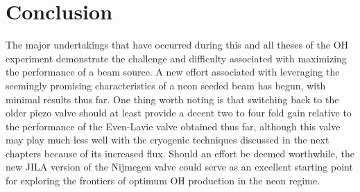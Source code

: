 \section{Conclusion}

The major undertakings that have occurred during this and all theses of the OH experiment demonstrate the challenge and difficulty associated with maximizing the performance of a beam source.
A new effort associated with leveraging the seemingly promising characteristics of a neon seeded beam has begun, with minimal results thus far.
One thing worth noting is that switching back to the older piezo valve should at least provide a decent two to four fold gain relative to the performance of the Even-Lavie valve obtained thus far, although this valve may play much less well with the cryogenic techniques discussed in the next chapters because of its increased flux.
Should an effort be deemed worthwhile, the new JILA version of the Nijmegen valve could serve as an excellent starting point for exploring the frontiers of optimum OH production in the neon regime.


\ifx\justbeingincluded\undefined

\fi
